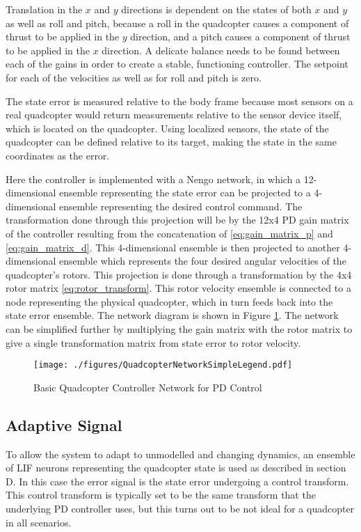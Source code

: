 \documentclass[letterpaper, 10 pt, conference]{ieeeconf}  %
\begin{document}
Translation in the $x$ and $y$ directions is dependent on the states of both $x$ and $y$ as well as roll and pitch, because a roll in the quadcopter causes a component of thrust to be applied in the $y$ direction, and a pitch causes a component of thrust to be applied in the $x$ direction.
A delicate balance needs to be found between each of the gains in order to create a stable, functioning controller. 
The setpoint for each of the velocities as well as for roll and pitch is zero.

The state error is measured relative to the body frame because most sensors on a real quadcopter would return measurements relative to the sensor device itself, which is located on the quadcopter. Using localized sensors, the state of the quadcopter can be defined relative to its target, making the state in the same coordinates as the error.

Here the controller is implemented with a Nengo network, in which a 12-dimensional ensemble representing the state error can be projected to a 4-dimensional ensemble representing the desired control command. 
The transformation done through this projection will be by the 12x4 PD gain matrix of the controller resulting from the concatenation of \eqref{eq:gain_matrix_p} and \eqref{eq:gain_matrix_d}. 
This 4-dimensional ensemble is then projected to another 4-dimensional ensemble which represents the four desired angular velocities of the quadcopter's rotors. 
This projection is done through a transformation by the 4x4 rotor matrix \eqref{eq:rotor_transform}. 
This rotor velocity ensemble is connected to a node representing the physical quadcopter, which in turn feeds back into the state error ensemble. 
The network diagram is shown in Figure \ref{fig:NetBasic}. 
The network can be simplified further by multiplying the gain matrix with the rotor matrix to give a single transformation matrix from state error to rotor velocity. 

\begin{figure}
\centering
\texttt{[image: ./figures/QuadcopterNetworkSimpleLegend.pdf]}
\caption{Basic Quadcopter Controller Network for PD Control}
\label{fig:NetBasic}
\end{figure}

\subsection{Adaptive Signal}

To allow the system to adapt to unmodelled and changing dynamics, an ensemble of LIF neurons representing the quadcopter state is used as described in section D.
In this case the error signal is the state error undergoing a control transform.
This control transform is typically set to be the same transform that the underlying PD controller uses, but this turns out to be not ideal for a quadcopter in all scenarios.
\end{document}

